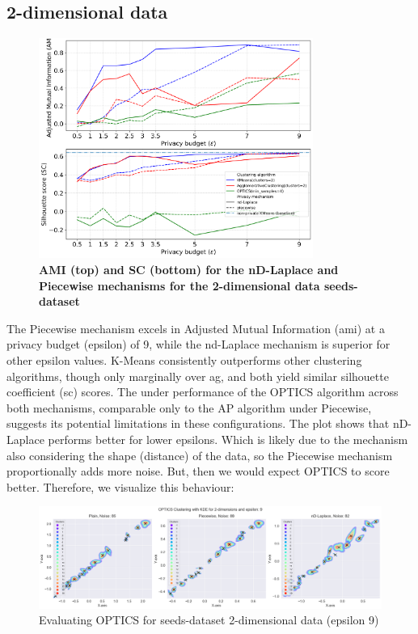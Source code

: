 \subsection{2-dimensional data}
\begin{figure}[H]
  \centering
  \caption{\textbf{AMI (top) and SC (bottom) for the nD-Laplace and Piecewise mechanisms for the 2-dimensional data seeds-dataset}}
  \includegraphics[width=0.8\textwidth]{Results/nd-laplace/nd-Laplace/seeds-dataset/ami-and-sc_2_dimensions.png}

  \label{fig:validation-seeds-dataset_comparison_2d-laplace}
\end{figure}
The Piecewise mechanism excels in Adjusted Mutual Information (\gls{ami}) at a privacy budget (epsilon) of 9, while the nd-Laplace mechanism is superior for other epsilon values. K-Means consistently outperforms other clustering algorithms, though only marginally over \gls{ag}, and both yield similar silhouette coefficient (\gls{sc}) scores. The under performance of the OPTICS algorithm across both mechanisms, comparable only to the AP algorithm under Piecewise, suggests its potential limitations in these configurations.
\newpage
The plot shows that nD-Laplace performs better for lower epsilons. Which is likely due to the mechanism also considering the shape (distance) of the data, so the Piecewise mechanism proportionally adds more noise. But, then we would expect OPTICS to score better. Therefore, we visualize this behaviour:
\begin{figure}[H]
  \centering
  \includegraphics[width=1\linewidth]{Discussion/behaviour-2d-seeds-dataset&optics.png}
  \caption{Evaluating OPTICS for seeds-dataset 2-dimensional data (epsilon 9)}
  \label{fig:evaluate-optics-seeds-dataset-2d-9eps}
\end{figure}
